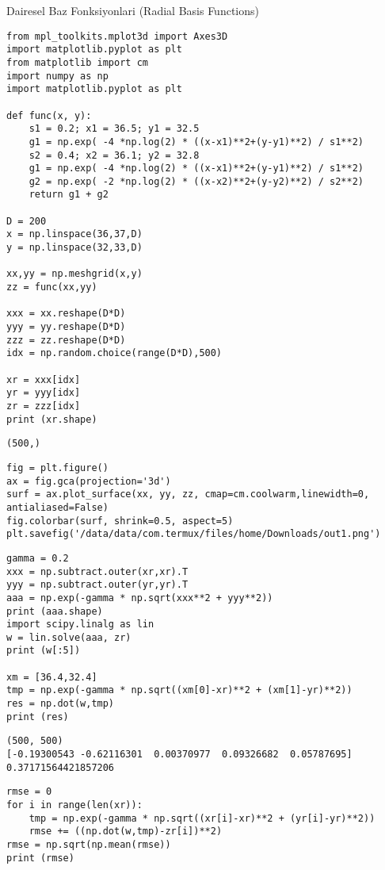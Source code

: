 \documentclass[12pt,fleqn]{article}\usepackage{../../common}
\begin{document}
Dairesel Baz Fonksiyonlari (Radial Basis Functions)

\begin{verbatim}
from mpl_toolkits.mplot3d import Axes3D
import matplotlib.pyplot as plt
from matplotlib import cm
import numpy as np
import matplotlib.pyplot as plt

def func(x, y):
    s1 = 0.2; x1 = 36.5; y1 = 32.5
    g1 = np.exp( -4 *np.log(2) * ((x-x1)**2+(y-y1)**2) / s1**2)
    s2 = 0.4; x2 = 36.1; y2 = 32.8
    g1 = np.exp( -4 *np.log(2) * ((x-x1)**2+(y-y1)**2) / s1**2)
    g2 = np.exp( -2 *np.log(2) * ((x-x2)**2+(y-y2)**2) / s2**2)
    return g1 + g2

D = 200
x = np.linspace(36,37,D)
y = np.linspace(32,33,D)

xx,yy = np.meshgrid(x,y)
zz = func(xx,yy)

xxx = xx.reshape(D*D)
yyy = yy.reshape(D*D)
zzz = zz.reshape(D*D)
idx = np.random.choice(range(D*D),500)

xr = xxx[idx]
yr = yyy[idx]
zr = zzz[idx]
print (xr.shape)
\end{verbatim}

\begin{verbatim}
(500,)
\end{verbatim}

\begin{verbatim}
fig = plt.figure()
ax = fig.gca(projection='3d')
surf = ax.plot_surface(xx, yy, zz, cmap=cm.coolwarm,linewidth=0, antialiased=False)
fig.colorbar(surf, shrink=0.5, aspect=5)
plt.savefig('/data/data/com.termux/files/home/Downloads/out1.png')
\end{verbatim}

\begin{verbatim}
gamma = 0.2
xxx = np.subtract.outer(xr,xr).T
yyy = np.subtract.outer(yr,yr).T
aaa = np.exp(-gamma * np.sqrt(xxx**2 + yyy**2))
print (aaa.shape)
import scipy.linalg as lin
w = lin.solve(aaa, zr)
print (w[:5])

xm = [36.4,32.4]
tmp = np.exp(-gamma * np.sqrt((xm[0]-xr)**2 + (xm[1]-yr)**2))
res = np.dot(w,tmp)
print (res)
\end{verbatim}

\begin{verbatim}
(500, 500)
[-0.19300543 -0.62116301  0.00370977  0.09326682  0.05787695]
0.37171564421857206
\end{verbatim}


\begin{verbatim}
rmse = 0
for i in range(len(xr)):
    tmp = np.exp(-gamma * np.sqrt((xr[i]-xr)**2 + (yr[i]-yr)**2))
    rmse += ((np.dot(w,tmp)-zr[i])**2)
rmse = np.sqrt(np.mean(rmse))
print (rmse)
\end{verbatim}
\end{document}
